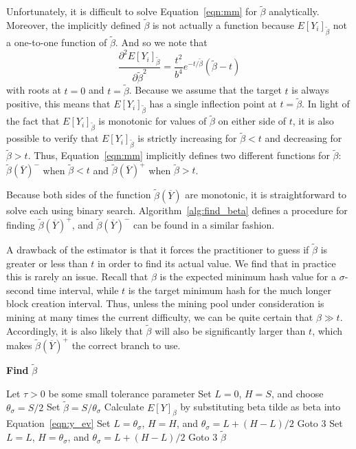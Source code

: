 \documentclass[10pt,sigconf]{acmart}
\newcommand{\1}{{\em (i)}}
\newcommand{\2}{{\em (ii)}}
\newcommand{\3}{{\em (iii)}}
\newcommand{\4}{{\em (iv)}}
\newcommand{\5}{{\em (v)}}
\begin{document}
Unfortunately, it is difficult to solve Equation~\ref{eqn:mm} for
$\tilde{\beta}$ analytically. Moreover, the implicitly defined
$\tilde{\beta}$ is not actually a function because
$E[Y_i]_{\tilde{\beta}}$ not a one-to-one function of $\tilde{\beta}$.
And so we note that\vspace{-1ex}
\begin{equation}
\frac{\partial^2 E[Y_i]_{\tilde{\beta}}}{\partial \tilde{\beta}^2} = \frac{t^2}{b^4} e^{-t / \tilde{\beta}}(\tilde{\beta} - t)
\end{equation}
with roots at $t = 0$ and $t = \tilde{\beta}$. Because we assume that
the target $t$ is always positive, this means that
$E[Y_i]_{\tilde{\beta}}$ has a single inflection point at
$t = \tilde{\beta}$. In light of the fact that
$E[Y_i]_{\tilde{\beta}}$ is monotonic for values of $\tilde{\beta}$ on
either side of $t$, it is also possible to verify that
$E[Y_i]_{\tilde{\beta}}$ is strictly increasing for
$\tilde{\beta} < t$ and decreasing for $\tilde{\beta} > t$. Thus,
Equation~\ref{eqn:mm} implicitly defines two different functions for
$\tilde{\beta}$: $\tilde{\beta}(\overline{Y})^-$ when
$\tilde{\beta} < t$ and $\tilde{\beta}(\overline{Y})^+$ when
$\tilde{\beta} > t$.

Because both sides of the function $\tilde{\beta}(\overline{Y})$ are
monotonic, it is straightforward to solve each using binary search.
Algorithm~\ref{alg:find_beta} defines a procedure for finding
$\tilde{\beta}(\overline{Y})^+$, and $\tilde{\beta}(\overline{Y})^-$
can be found in a similar fashion.

A  drawback of the estimator is that it forces the practitioner
to guess if $\tilde{\beta}$ is greater or less than $t$ in order to
find its actual value. We find that in practice this is rarely an
issue. Recall that $\beta$ is the expected minimum hash value for a $\sigma$-second time interval, while $t$ is the target minimum hash for the much longer block creation interval. Thus, unless the mining pool under consideration is mining at many times the current difficulty, we can be quite certain that $\beta \gg t$. Accordingly, it is also likely that $\tilde{\beta}$ will also be significantly larger than $t$, which makes $\tilde{\beta}(\overline{Y})^+$ the correct branch to use. 

\begin{algorithm}
\caption{\textbf{Find }$\tilde{\beta}$}
\label{alg:find_beta}
\begin{algorithmic}[1]
\STATE Let $\tau > 0$ be some small tolerance parameter
\STATE Set $L = 0$, $H = S$, and choose $\theta_\sigma = S/2$
\STATE Set $\tilde{\beta} = S/\theta_\sigma$
\STATE Calculate $E[Y]_{\beta}$ by substituting beta tilde as beta into Equation~\ref{eqn:y_ev}
	\STATE Set $L = \theta_\sigma$, $H = H$, and $\theta_\sigma = L+(H-L)/2$
	\STATE Goto 3
	\STATE Set $L = L$, $H = \theta_\sigma$, and $\theta_\sigma = L+(H-L)/2$ 
	\STATE Goto 3
\ELSE 
	\RETURN $\tilde{\beta}$
\ENDIF
\end{algorithmic}
\end{algorithm}
\end{document}
